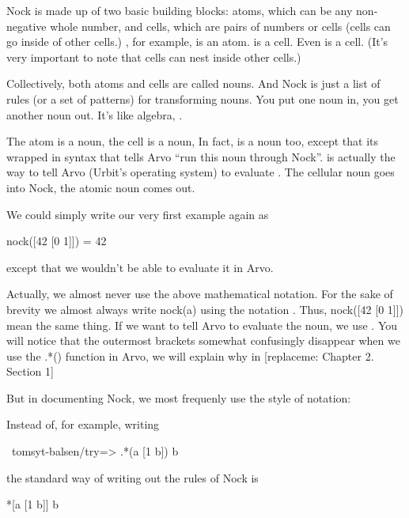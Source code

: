 Nock is made up of two basic building blocks: atoms, which can be any
non-negative whole number, and cells, which are pairs of numbers or cells
(cells can go inside of other cells.) , for example, is an atom. \kode{[0 1]} is
a cell. Even \kode{[42 [0 1]]} is a cell. (It's very important to note that cells
can nest inside other cells.)

Collectively, both atoms and cells are called nouns. And Nock is just a list of
rules (or a set of patterns) for transforming nouns.  You put one noun in, you
get another noun out. It's like algebra, . 

The atom  is a noun, the cell \kode{[0 1]} is a noun, In fact, 
is a noun too, except that its wrapped in syntax that tells Arvo ``run
this noun through Nock''.  is actually the way to tell Arvo
(Urbit's operating system) to evaluate . The cellular noun
\kode{[42 [0 1]]} goes into Nock, the atomic noun  comes out.

We could simply write our very first example again as 

\begin{code}
nock([42 [0 1]]) = 42
\end{code}
except that we wouldn't be able to evaluate it in Arvo.

Actually, we almost never use the above mathematical notation. For the sake of
brevity we almost always write nock(a) using the notation . Thus, nock([42
[0 1]])  \kode{*[42 [0 1]]} mean the same thing. If we want to tell Arvo to evaluate
the noun, we use . You will notice that the outermost brackets
somewhat confusingly disappear when we use the .*() function in Arvo, we will
explain why in [replaceme: Chapter 2. Section 1] 

But in documenting Nock, we most frequenly use the \kode{*[42 [0 1]]} style of
notation:

Instead of, for example, writing

\begin{code}
~tomsyt-balsen/try=> .*(a [1 b]) 
b
\end{code}

the standard way of writing out the rules of Nock is 

\begin{code}
*[a [1 b]]                  b
\end{code}

